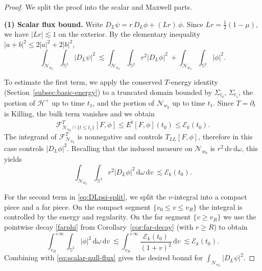 \documentclass[11pt]{article}
\numberwithin{equation}{section}
\theoremstyle{plain}
\theoremstyle{definition}
\theoremstyle{remark}
\newcommand{\dd}{\mathrm{d}}
\begin{document}
\begin{proof}
We split the proof into the scalar and Maxwell parts.

\smallskip\noindent
\textbf{(1) Scalar flux bound.}
Write $D_L\psi = r\,D_L\phi + (Lr)\,\phi$.
Since $Lr=\tfrac12(1-\mu)$, we have $|Lr|\lesssim 1$ on the exterior.
By the elementary inequality $|a+b|^2\le 2|a|^2+2|b|^2$,
\begin{equation}\label{eq:DLpsi-split}
\int_{\mathcal{N}_{w_0}}\!\!\int_{\mathbb{S}^2}|D_L\psi|^2
\ \lesssim
\int_{\mathcal{N}_{w_0}}\!\!\int_{\mathbb{S}^2} r^2|D_L\phi|^2
\ +
\int_{\mathcal{N}_{w_0}}\!\!\int_{\mathbb{S}^2} |\phi|^2.
\end{equation}

To estimate the first term, we apply the conserved $T$-energy identity (Section~\ref{subsec:basic-energy}) to a truncated domain bounded by $\Sigma_{t_0}$, $\Sigma_{t_1}$, the portion of $\mathcal{H}^+$ up to time $t_1$, and the portion of $\mathcal{N}_{w_0}$ up to time $t_1$.
Since $T=\partial_t$ is Killing, the bulk term vanishes and we obtain
\begin{equation}
\mathcal{F}^{T}_{\mathcal{N}_{w_0}\cap\{t\le t_1\}}[F,\phi]
\le
E^{\hat t}[F,\phi](t_0)
\le
\mathcal{E}_k(t_0).
\end{equation}
The integrand of $\mathcal{F}^{T}_{\mathcal{N}_{w_0}}$ is nonnegative and controls $T_{LL}[F,\phi]$, therefore in this case controls $|D_L\phi|^2$.
Recalling that the induced measure on $\mathcal{N}_{w_0}$ is $r^2\,\dd v\,\dd\omega$, this yields
\begin{equation}\label{eq:scalar-null-flux}
\int_{\mathcal{N}_{w_0}}\!\!\int_{\mathbb{S}^2} r^2|D_L\phi|^2\,\dd\omega\,\dd v
\ \lesssim
\mathcal{E}_k(t_0).
\end{equation}

For the second term in \eqref{eq:DLpsi-split}, we split the $v$-integral into a compact piece and a far piece.
On the compact segment $\{v_0\le v\le v_R\}$ the integral is controlled by the energy and regularity.
On the far segment $\{v\ge v_R\}$ we use the pointwise decay \eqref{farphi} from Corollary~\ref{cor:far-decay} (with $r\ge R$) to obtain
\begin{equation}
\int_{v_R}^{+\infty}\!\!\int_{\mathbb{S}^2} |\phi|^2\,\dd\omega\,\dd v
\ \lesssim
\int_{v_R}^{+\infty}\frac{\mathcal{E}_k(t_0)}{(1+v)^2}\,\dd v
\ \lesssim
\mathcal{E}_k(t_0).
\end{equation}
Combining with \eqref{eq:scalar-null-flux} gives the desired bound for $\int_{\mathcal{N}_{w_0}}|D_L\psi|^2$.


\end{proof}
\end{document}
